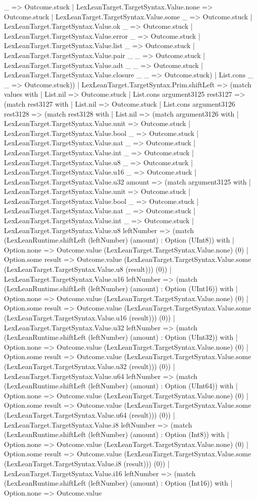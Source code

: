 \documentclass[11pt]{article}
\begin{document}
\_ => Outcome.stuck | LexLeanTarget.TargetSyntax.Value.none => Outcome.stuck | LexLeanTarget.TargetSyntax.Value.some \_ => Outcome.stuck | LexLeanTarget.TargetSyntax.Value.ok \_ => Outcome.stuck | LexLeanTarget.TargetSyntax.Value.error \_ => Outcome.stuck | LexLeanTarget.TargetSyntax.Value.list \_ => Outcome.stuck | LexLeanTarget.TargetSyntax.Value.pair \_ \_ => Outcome.stuck | LexLeanTarget.TargetSyntax.Value.adt \_ \_ => Outcome.stuck | LexLeanTarget.TargetSyntax.Value.closure \_ \_ => Outcome.stuck) | List.cons \_ \_ => Outcome.stuck)) | LexLeanTarget.TargetSyntax.Prim.shiftLeft => (match values with | List.nil => Outcome.stuck | List.cons argument3125 rest3127 => (match rest3127 with | List.nil => Outcome.stuck | List.cons argument3126 rest3128 => (match rest3128 with | List.nil => (match argument3126 with | LexLeanTarget.TargetSyntax.Value.unit => Outcome.stuck | LexLeanTarget.TargetSyntax.Value.bool \_ => Outcome.stuck | LexLeanTarget.TargetSyntax.Value.nat \_ => Outcome.stuck | LexLeanTarget.TargetSyntax.Value.int \_ => Outcome.stuck | LexLeanTarget.TargetSyntax.Value.u8 \_ => Outcome.stuck | LexLeanTarget.TargetSyntax.Value.u16 \_ => Outcome.stuck | LexLeanTarget.TargetSyntax.Value.u32 amount => (match argument3125 with | LexLeanTarget.TargetSyntax.Value.unit => Outcome.stuck | LexLeanTarget.TargetSyntax.Value.bool \_ => Outcome.stuck | LexLeanTarget.TargetSyntax.Value.nat \_ => Outcome.stuck | LexLeanTarget.TargetSyntax.Value.int \_ => Outcome.stuck | LexLeanTarget.TargetSyntax.Value.u8 leftNumber => (match (LexLeanRuntime.shiftLeft (leftNumber) (amount) : Option (UInt8)) with | Option.none => Outcome.value (LexLeanTarget.TargetSyntax.Value.none) (0) | Option.some result => Outcome.value (LexLeanTarget.TargetSyntax.Value.some (LexLeanTarget.TargetSyntax.Value.u8 (result))) (0)) | LexLeanTarget.TargetSyntax.Value.u16 leftNumber => (match (LexLeanRuntime.shiftLeft (leftNumber) (amount) : Option (UInt16)) with | Option.none => Outcome.value (LexLeanTarget.TargetSyntax.Value.none) (0) | Option.some result => Outcome.value (LexLeanTarget.TargetSyntax.Value.some (LexLeanTarget.TargetSyntax.Value.u16 (result))) (0)) | LexLeanTarget.TargetSyntax.Value.u32 leftNumber => (match (LexLeanRuntime.shiftLeft (leftNumber) (amount) : Option (UInt32)) with | Option.none => Outcome.value (LexLeanTarget.TargetSyntax.Value.none) (0) | Option.some result => Outcome.value (LexLeanTarget.TargetSyntax.Value.some (LexLeanTarget.TargetSyntax.Value.u32 (result))) (0)) | LexLeanTarget.TargetSyntax.Value.u64 leftNumber => (match (LexLeanRuntime.shiftLeft (leftNumber) (amount) : Option (UInt64)) with | Option.none => Outcome.value (LexLeanTarget.TargetSyntax.Value.none) (0) | Option.some result => Outcome.value (LexLeanTarget.TargetSyntax.Value.some (LexLeanTarget.TargetSyntax.Value.u64 (result))) (0)) | LexLeanTarget.TargetSyntax.Value.i8 leftNumber => (match (LexLeanRuntime.shiftLeft (leftNumber) (amount) : Option (Int8)) with | Option.none => Outcome.value (LexLeanTarget.TargetSyntax.Value.none) (0) | Option.some result => Outcome.value (LexLeanTarget.TargetSyntax.Value.some (LexLeanTarget.TargetSyntax.Value.i8 (result))) (0)) | LexLeanTarget.TargetSyntax.Value.i16 leftNumber => (match (LexLeanRuntime.shiftLeft (leftNumber) (amount) : Option (Int16)) with | Option.none => Outcome.value 
\end{document}

